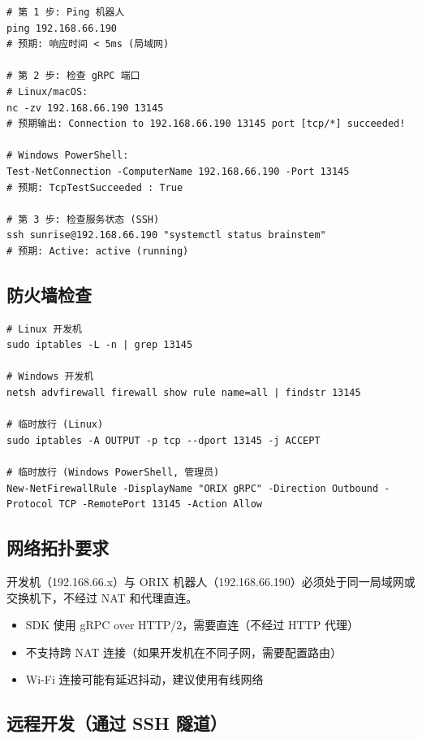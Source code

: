 \documentclass[a4paper,11pt,openany]{book}
\begin{document}
\begin{lstlisting}[style=bash]
# 第 1 步: Ping 机器人
ping 192.168.66.190
# 预期: 响应时间 < 5ms (局域网)

# 第 2 步: 检查 gRPC 端口
# Linux/macOS:
nc -zv 192.168.66.190 13145
# 预期输出: Connection to 192.168.66.190 13145 port [tcp/*] succeeded!

# Windows PowerShell:
Test-NetConnection -ComputerName 192.168.66.190 -Port 13145
# 预期: TcpTestSucceeded : True

# 第 3 步: 检查服务状态 (SSH)
ssh sunrise@192.168.66.190 "systemctl status brainstem"
# 预期: Active: active (running)
\end{lstlisting}

\subsection{防火墙检查}

\begin{lstlisting}[style=bash]
# Linux 开发机
sudo iptables -L -n | grep 13145

# Windows 开发机
netsh advfirewall firewall show rule name=all | findstr 13145

# 临时放行 (Linux)
sudo iptables -A OUTPUT -p tcp --dport 13145 -j ACCEPT

# 临时放行 (Windows PowerShell, 管理员)
New-NetFirewallRule -DisplayName "ORIX gRPC" -Direction Outbound -Protocol TCP -RemotePort 13145 -Action Allow
\end{lstlisting}

\subsection{网络拓扑要求}

开发机（192.168.66.x）与 ORIX 机器人（192.168.66.190）必须处于同一局域网或交换机下，不经过 NAT 和代理直连。

\begin{itemize}[nosep]
  \item SDK 使用 gRPC over HTTP/2，需要直连（不经过 HTTP 代理）
  \item 不支持跨 NAT 连接（如果开发机在不同子网，需要配置路由）
  \item Wi-Fi 连接可能有延迟抖动，建议使用有线网络
\end{itemize}

\subsection{远程开发（通过 SSH 隧道）}
\end{document}
